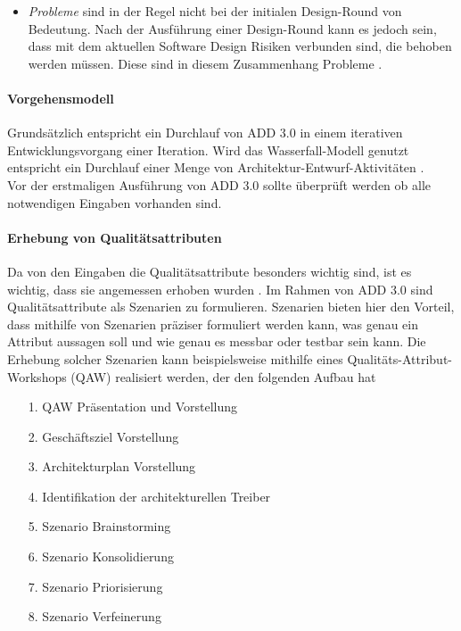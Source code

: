 \begin{itemize}
\begin{itemize}
\item \emph{Probleme} sind in der Regel nicht bei der initialen Design-Round von Bedeutung. Nach der Ausführung einer Design-Round kann es jedoch sein, dass mit dem aktuellen Software Design Risiken verbunden sind, die behoben werden müssen. Diese sind in diesem Zusammenhang Probleme \cite{Cer01}.\\
\end{itemize}
\end{itemize}

\paragraph{Vorgehensmodell}
Grundsätzlich entspricht ein Durchlauf von ADD 3.0 in einem iterativen Entwicklungsvorgang einer Iteration. Wird das Wasserfall-Modell genutzt entspricht ein Durchlauf einer Menge von Architektur-Entwurf-Aktivitäten \cite{Cer01}.\\

Vor der erstmaligen Ausführung von ADD 3.0 sollte überprüft werden ob alle notwendigen Eingaben vorhanden sind.\\

\paragraph{Erhebung von Qualitätsattributen}
Da von den Eingaben die Qualitätsattribute besonders wichtig sind, ist es wichtig, dass sie angemessen erhoben wurden \cite{Cer01}. Im Rahmen von ADD 3.0 sind Qualitätsattribute als Szenarien zu formulieren. Szenarien bieten hier den Vorteil, dass mithilfe von Szenarien präziser formuliert werden kann, was genau ein Attribut aussagen soll und wie genau es messbar oder testbar sein kann. Die Erhebung solcher Szenarien kann beispielsweise mithilfe eines Qualitäts-Attribut-Workshops (QAW) realisiert werden, der den folgenden Aufbau hat \cite{Cer01}\\

\begin{itemize}
\item[1.] QAW Präsentation und Vorstellung
\item[2.] Geschäftsziel Vorstellung
\item[3.] Architekturplan Vorstellung
\item[4.] Identifikation der architekturellen Treiber
\item[5.] Szenario Brainstorming
\item[6.] Szenario Konsolidierung
\item[7.] Szenario Priorisierung
\item[8.] Szenario Verfeinerung \\
\end{itemize}

